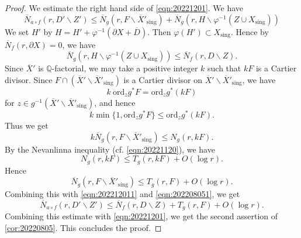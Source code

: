 \documentclass[11pt,english]{smfart}
\theoremstyle{plain}
\theoremstyle{definition}
\theoremstyle{remark}
\numberwithin{equation}{section}
\theoremstyle{plain}
\def\D{\mathscr{D}}
\def\D{D}
\begin{document}
\begin{proof}
		
		We estimate the right hand side of \eqref{eqn:20221201}.
		We have
		\begin{equation}\label{eqn:202212011}
			\overline{N}_{a \circ
				f}(r,\D'\backslash Z')
			\leq \overline{N}_{g}(r,F\backslash  \overline{X}'_{\mathrm{sing}})+\overline{N}_{g}(r,H\backslash  \varphi^{-1}(Z\cup X_{\mathrm{sing}}))
		\end{equation}
		We set $H'$ by $H=H'+\varphi^{-1}(\partial X+\overline{D})$.
		Then $\varphi(H')\subset X_{\mathrm{sing}}$.
		Hence by $\overline{N}_f(r,\partial X)=0$, 
		we have
		\begin{equation}\label{eqn:202208051} 	\overline{N}_g(r,H\backslash \varphi^{-1}(Z\cup X_{\mathrm{sing}}))\leq \overline{N}_f(r,D\backslash Z).
		\end{equation}
		Since $\overline{X}'$ is $\mathbb Q$-factorial, we may take a positive integer $k$ such that $kF$ is a Cartier divisor.
		Since $F\cap (\overline{X}'\backslash \overline{X}'_{\mathrm{sing}})$
		is a Cartier divisor
		on $\overline{X}'\backslash \overline{X}'_{\mathrm{sing}}$, we have
		$$
		k\ \mathrm{ord}_z g^{*}F=\mathrm{ord}_z g^{*}(kF)
		$$
		for $z\in g^{-1} (\overline{X}'\backslash \overline{X}'_{\mathrm{sing}})$,
		and hence
		$$
		k\min \{ 1,\mathrm{ord}_z g^{*}F\}
		\leq \mathrm{ord}_z g^{*}(kF).
		$$
		Thus we get
		\begin{equation*}
			k\overline{N}_g(r,F\backslash \overline{X}'_{\mathrm{sing}})\leq
			N_g(r,kF).
		\end{equation*}
		By the Nevanlinna inequality (cf. \eqref{eqn:20221120}), we have
		$$
		N_g(r,kF)\leq T_{g}(r,kF)+O(\log r).
		$$
		Hence
		\begin{equation*}
			\overline{N}_g(r,F\backslash \overline{X}'_{\mathrm{sing}})\leq T_{g}(r,F)+O(\log r).
		\end{equation*}
		Combining this with \eqref{eqn:202212011} and \eqref{eqn:202208051}, we get
		$$
		\overline{N}_{a \circ
			f}(r,\D'\backslash Z')\leq \overline{N}_f(r,D\backslash Z)+T_{g}(r,F)+O(\log r).	$$
		Combining this estimate with \eqref{eqn:20221201}, we get the second assertion of \cref{cor:20220805}.
		This concludes the proof.
	\end{proof}
	
	
	
	
	
	
	
	
	
	
	
	
	
	
	
\end{document}
